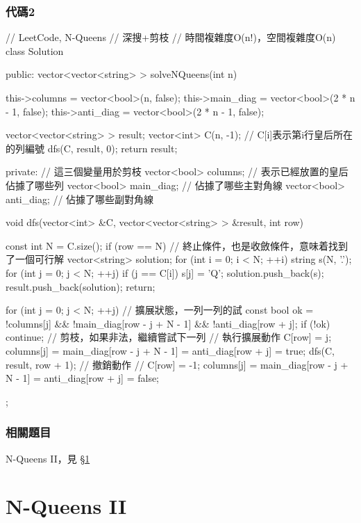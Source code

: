 \subsubsection{代碼2}
\begin{Code}
// LeetCode, N-Queens
// 深搜+剪枝
// 時間複雜度O(n!)，空間複雜度O(n)
class Solution {
public:
    vector<vector<string> > solveNQueens(int n) {
        this->columns = vector<bool>(n, false);
        this->main_diag = vector<bool>(2 * n - 1, false);
        this->anti_diag = vector<bool>(2 * n - 1, false);

        vector<vector<string> > result;
        vector<int> C(n, -1);  // C[i]表示第i行皇后所在的列編號
        dfs(C, result, 0);
        return result;
    }
private:
    // 這三個變量用於剪枝
    vector<bool> columns;  // 表示已經放置的皇后佔據了哪些列
    vector<bool> main_diag;  // 佔據了哪些主對角線
    vector<bool> anti_diag;  // 佔據了哪些副對角線

    void dfs(vector<int> &C, vector<vector<string> > &result, int row) {
        const int N = C.size();
        if (row == N) { // 終止條件，也是收斂條件，意味着找到了一個可行解
            vector<string> solution;
            for (int i = 0; i < N; ++i) {
                string s(N, '.');
                for (int j = 0; j < N; ++j) {
                    if (j == C[i]) s[j] = 'Q';
                }
                solution.push_back(s);
            }
            result.push_back(solution);
            return;
        }

        for (int j = 0; j < N; ++j) {  // 擴展狀態，一列一列的試
            const bool ok = !columns[j] && !main_diag[row - j + N - 1]  &&
                    !anti_diag[row + j];
            if (!ok) continue;  // 剪枝，如果非法，繼續嘗試下一列
            // 執行擴展動作
            C[row] = j;
            columns[j] = main_diag[row - j + N - 1] = anti_diag[row + j] = true;
            dfs(C, result, row + 1);
            // 撤銷動作
            // C[row] = -1;
            columns[j] = main_diag[row - j + N - 1] = anti_diag[row + j] = false;
        }
    }
};
\end{Code}


\subsubsection{相關題目}
\begindot
\item N-Queens II，見 \S \ref{sec:n-queens-ii}
\myenddot


\section{N-Queens II} %
\label{sec:n-queens-ii}



